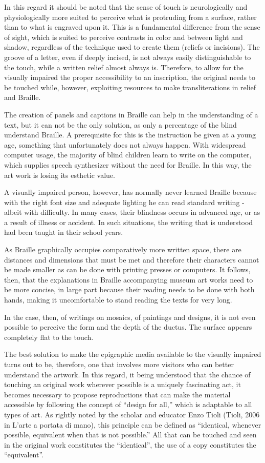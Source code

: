 \documentclass[amsthm,ebook]{saparticle}
\begin{document}
In this regard it should be noted that the sense of touch is neurologically and physiologically more suited to perceive
what is protruding from a surface, rather than to what is engraved upon it. This is a fundamental difference from the
sense of sight, which is suited to perceive contrasts in color and between light and shadow, regardless of the
technique used to create them (reliefs or incisions). The groove of a letter, even if deeply incised, is not always
easily distinguishable to the touch, while a written relief almost always is. Therefore, to allow for the visually
impaired the proper accessibility to an inscription, the original needs to be touched while, however, exploiting
resources to make transliterations in relief and Braille.

The creation of panels and captions in Braille can help in the understanding of a text, but it can not be the only
solution, as only a percentage of the blind understand Braille. A prerequisite for this is the instruction be given at
a young age, something that unfortunately does not always happen. With widespread computer usage, the majority of blind
children learn to write on the computer, which supplies speech synthesizer without the need for Braille. In this way,
the art work is losing its esthetic value.

A visually impaired person, however, has normally never learned Braille because with the right font size and adequate
lighting he can read standard writing - albeit with difficulty. In many cases, their blindness occurs in advanced age,
or as a result of illness or accident. In such situations, the writing that is understood had been taught in their
school years.

As Braille graphically occupies comparatively more written space, there are distances and dimensions that must be met
and therefore their characters cannot be made smaller as can be done with printing presses or computers. It follows,
then, that the explanations in Braille accompanying museum art works need to be more concise, in large part because
their reading needs to be done with both hands, making it uncomfortable to stand reading the texts for very long.

In the case, then, of writings on mosaics, of paintings and designs, it is not even possible to perceive the form and
the depth of the ductus. The surface appears completely flat to the touch.

The best solution to make the epigraphic media available to the visually impaired turns out to be, therefore, one that
involves more visitors who can better understand the artwork. In this regard, it being understood that the chance of
touching an original work wherever possible is a uniquely fascinating act, it becomes necessary to propose
reproductions that can make the material accessible by following the concept of “design for all,” which is adaptable to
all types of art. As rightly noted by the scholar and educator Enzo Tioli (Tioli, 2006 in L’arte a portata di mano),
this principle can be defined as “identical, whenever possible, equivalent when that is not possible.” All that can be
touched and seen in the original work constitutes the “identical”, the use of a copy constitutes the “equivalent”.
\end{document}

